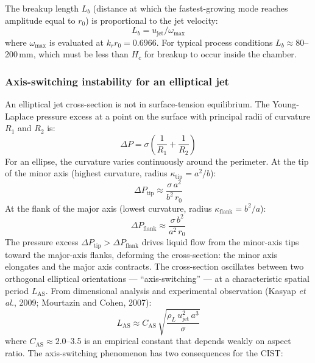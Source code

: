 \documentclass[11pt,letterpaper]{article}
\newcommand{\rhoL}{\rho_L}
\newcommand{\ujet}{u_{\mathrm{jet}}}
\newcommand{\Hc}{H_c}
\newcommand{\Lsw}{L_{\mathrm{AS}}}
\begin{document}
The breakup length $L_b$ (distance at which the fastest-growing mode
reaches amplitude equal to $r_0$) is proportional to the jet velocity:
\begin{equation}
  L_b = \ujet / \omega_{\max}
  \label{eq:lb_circle}
\end{equation}
where $\omega_{\max}$ is evaluated at $k_r r_0 = 0.6966$.  For typical
process conditions $L_b \approx 80$--200\,mm, which must be less than
$\Hc$ for breakup to occur inside the chamber.

\subsubsection{Axis-switching instability for an elliptical jet}
\label{sec:axis_switch}

An elliptical jet cross-section is not in surface-tension equilibrium.
The Young-Laplace pressure excess at a point on the surface with principal
radii of curvature $R_1$ and $R_2$ is:
\begin{equation}
  \Delta P = \sigma\left(\frac{1}{R_1} + \frac{1}{R_2}\right)
  \label{eq:young_laplace}
\end{equation}
For an ellipse, the curvature varies continuously around the perimeter.
At the tip of the minor axis (highest curvature, radius $\kappa_{\mathrm{tip}}
= a^2/b$):
\begin{equation}
  \Delta P_{\mathrm{tip}} \approx \frac{\sigma\,a^2}{b^2\,r_0}
  \label{eq:dp_tip}
\end{equation}
At the flank of the major axis (lowest curvature, radius $\kappa_{\mathrm{flank}}
= b^2/a$):
\begin{equation}
  \Delta P_{\mathrm{flank}} \approx \frac{\sigma\,b^2}{a^2\,r_0}
  \label{eq:dp_flank}
\end{equation}
The pressure excess $\Delta P_{\mathrm{tip}} > \Delta P_{\mathrm{flank}}$
drives liquid flow from the minor-axis tips toward the major-axis flanks,
deforming the cross-section: the minor axis elongates and the major axis
contracts.  The cross-section oscillates between two orthogonal elliptical
orientations --- ``axis-switching'' --- at a characteristic spatial
period $\Lsw$.  From dimensional analysis and experimental observation
(Kasyap \textit{et al.}, 2009; Mourtazin and Cohen, 2007):
\begin{equation}
  \Lsw \approx C_{\mathrm{AS}}\,\sqrt{\frac{\rhoL\,\ujet^2\,a^3}{\sigma}}
  \label{eq:las}
\end{equation}
where $C_{\mathrm{AS}} \approx 2.0$--3.5 is an empirical constant that
depends weakly on aspect ratio.  The axis-switching phenomenon has two
consequences for the CIST:
\end{document}

